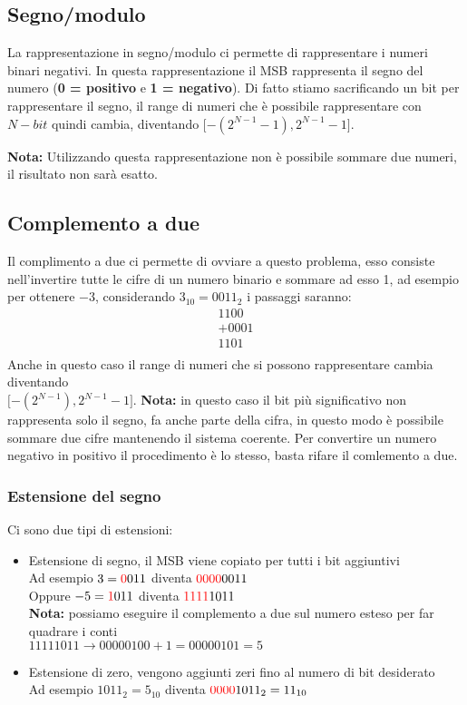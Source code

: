 \documentclass[../main.tex]{subfiles}
\begin{document}
\subsection{Segno/modulo}
La rappresentazione in segno/modulo ci permette di rappresentare i numeri binari negativi.
In questa rappresentazione il MSB rappresenta il segno del numero (\textbf{0 = positivo} e \textbf{1 = negativo}).
Di fatto stiamo sacrificando un bit per rappresentare il segno, il range di numeri che è possibile rappresentare con $N-bit$ quindi cambia, diventando $\lbrack -(2^{N-1}-1), 2^{N-1}-1 \rbrack$.

\textbf{Nota:} Utilizzando questa rappresentazione non è possibile sommare due numeri, il risultato non sarà esatto.

\subsection{Complemento a due}
Il complimento a due ci permette di ovviare a questo problema, esso consiste nell'invertire tutte le cifre di un numero binario e sommare ad esso 1, ad esempio per ottenere $-3$, considerando $3_{10}=0011_2$ i passaggi saranno:
$$
    \begin{array}{r}
            1100 \\
        +   0001 \\
            \hline
            1101 \\
    \end{array}
$$
Anche in questo caso il range di numeri che si possono rappresentare cambia diventando \\ $\lbrack -(2^{N-1}), 2^{N-1}-1 \rbrack$.
\textbf{Nota:} in questo caso il bit più significativo non rappresenta solo il segno, fa anche parte della cifra, in questo modo è possibile
sommare due cifre mantenendo il sistema coerente. Per convertire un numero negativo in positivo il procedimento è lo stesso, basta rifare il comlemento a due.

\subsubsection{Estensione del segno}
Ci sono due tipi di estensioni:
\begin{itemize}
    \item Estensione di segno, il MSB viene copiato per tutti i bit aggiuntivi \\
    Ad esempio $3=\color{red}0\color{black}011$ diventa $\color{red}0000\color{black}0011$ \\
    Oppure $-5 = \color{red}1\color{black}011$ diventa $\color{red}1111\color{black}1011$ \\
    \textbf{Nota:} possiamo eseguire il complemento a due sul numero esteso per far quadrare i conti \\
    $1111 1011 \rightarrow 0000 0100 + 1 = 0000 0101 = 5$

    \item Estensione di zero, vengono aggiunti zeri fino al numero di bit desiderato \\
    Ad esempio $1011_2 = 5_{10}$ diventa $\color{red}0000\color{black}1011_2 = 11_{10}$
\end{itemize}
\end{document}
